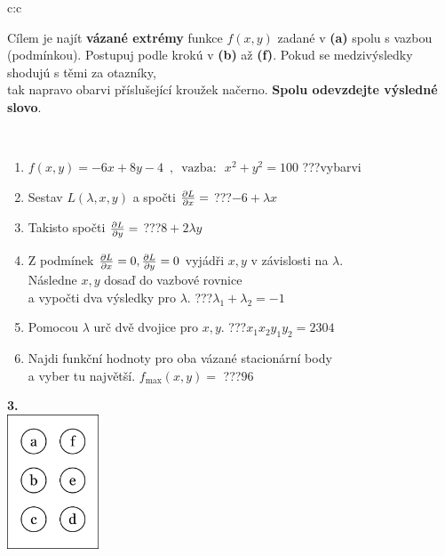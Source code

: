 \documentclass[10pt]{report}
\begin{document}
\begin{tabular}{c:c}
\begin{minipage}[c][104.5mm][t]{0.5\linewidth}
\begin{center}
\begin{minipage}{0.95\linewidth}
\begin{center}
Cílem je najít \textbf{vázané extrémy} funkce $f(x,y)$ zadané v \textbf{(a)} spolu s vazbou (podmínkou). Postupuj podle krokú v \textbf{(b)} až \textbf{(f)}. Pokud se medzivýsledky shodujú s těmi za otazníky,\\tak napravo obarvi příslušející kroužek načerno. \textbf{Spolu odevzdejte výsledné slovo}.
\end{center}
\end{minipage}
\\[1mm]
\begin{minipage}{0.79\linewidth}
\begin{center}
\begin{varwidth}{\linewidth}
\begin{enumerate}
\normalsize
\item $f(x,y)=-6x+8y-4 \enspace , \enspace \mathrm{vazba:} \enspace x^2+y^2=100$\quad \dotfill\; ???\;\dotfill \quad vybarvi
\item Sestav $L(\lambda,x,y)$ a spočti $\pdv{L}{x}=$\quad \dotfill\; ???\;\dotfill \quad $-6+\lambda x$
\item Takisto spočti $\pdv{L}{y}=$\quad \dotfill\; ???\;\dotfill \quad $8+2\lambda y$
\item Z podmínek $\pdv{L}{x}=0 , \pdv{L}{y}=0$ vyjádři $x,y$ v závislosti na $\lambda$.\\ \phantom{xxxxxx}Následne $x,y$ dosaď do vazbové rovnice\\ \phantom{xxxxxx}a vypočti dva výsledky pro $\lambda$.\quad \dotfill\; ???\;\dotfill \quad $\lambda_1+\lambda_2=-1$
\item Pomocou $\lambda$ urč dvě dvojice pro $x,y$.\quad \dotfill\; ???\;\dotfill \quad $x_1 x_2 y_1 y_2=2304$
\item Najdi funkční hodnoty pro oba vázané stacionární body\\ \phantom{xxxxxx}a vyber tu najvětší. $f_{\text{max}}(x,y)=$\quad \dotfill\; ???\;\dotfill \quad $96$
\end{enumerate}
\end{varwidth}
\end{center}
\end{minipage}
\begin{minipage}{0.20\linewidth}
\begin{center}
{\Huge\bfseries 3.} \\[2mm]
\includegraphics[height=40mm]{../images/braille.png}

\end{center}
\end{minipage}
\end{center}
\end{minipage}
\end{tabular}
\end{document}
